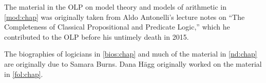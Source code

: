 The material in the OLP on model theory and models of arithmetic in
\cref{mod:chap} was originally taken from Aldo Antonelli's lecture
notes on ``The Completeness of Classical Propositional and Predicate
Logic,'' which he contributed to the OLP before his untimely death in
2015.

The biographies of logicians in \cref{bios:chap} and much of the
material in \cref{nd:chap} are originally due to Samara Burns.
Dana H\"agg originally worked on the material in \cref{fol:chap}.

